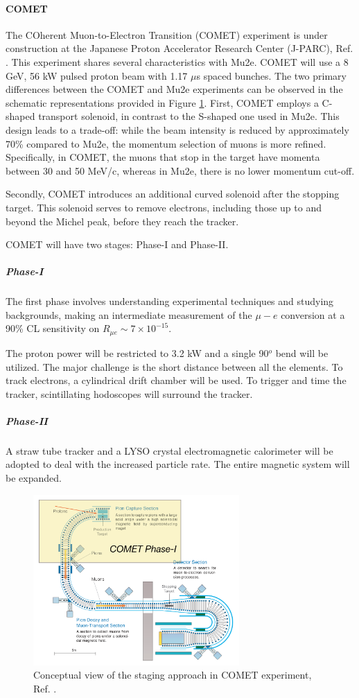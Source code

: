 \paragraph{COMET}
The COherent Muon-to-Electron 
Transition (COMET) experiment is 
under construction at
the Japanese Proton Accelerator 
Research Center (J-PARC), Ref. \cite{Abramishvili_2020}. 
This experiment shares several 
characteristics with Mu2e. COMET 
will use a 8 GeV, 56 kW pulsed proton beam
with 1.17 $\mu$s spaced bunches. 
The two primary differences between 
the COMET and Mu2e experiments can 
be observed in the schematic representations 
provided in Figure \ref{fig:comet}. First, 
COMET employs a C-shaped transport solenoid, 
in contrast to the S-shaped one used in Mu2e. 
This design leads to a trade-off: while the 
beam intensity is reduced by approximately 
70\% compared to Mu2e, the momentum selection 
of muons is more refined. Specifically, in 
COMET, the muons that stop in the target 
have momenta between 30 and 50 MeV/c, whereas 
in Mu2e, there is no lower momentum cut-off. 

Secondly, COMET introduces an 
additional curved solenoid after 
the stopping target. This solenoid serves 
to remove electrons, including those 
up to and beyond the Michel peak, 
before they reach the tracker.

COMET will have two stages: Phase-I and Phase-II.
\subparagraph*{Phase-I} The first phase 
involves understanding experimental 
techniques and studying backgrounds, 
making an intermediate
measurement of the $\mu-e$ conversion at a 90\% CL 
sensitivity on $R_{\mu e} \sim 7\times 10^{-15}$.

The proton power will be restricted to 
3.2 kW and a single 90$^o$ bend will be utilized.
The major challenge is the short distance 
between all the elements. 
To track electrons, a cylindrical drift 
chamber will be used. To trigger and time the tracker, 
scintillating hodoscopes will surround the tracker. 
\subparagraph*{Phase-II} A straw tube 
tracker and a LYSO crystal electromagnetic 
calorimeter will be adopted to deal 
with the increased particle rate. 
The entire magnetic system will be expanded.

\begin{figure}[!h]
\centering
\includegraphics[width =0.7\textwidth]{figures/png/Screenshot_20240307_152133.png}
\caption[COMET experiment.]{Conceptual view of the staging approach in COMET experiment, Ref. \cite{Abramishvili_2020}.}
\label{fig:comet}
\end{figure}

